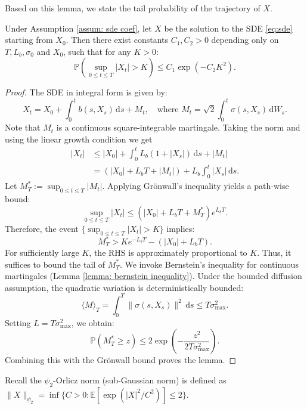 \documentclass[twoside,11pt]{article}
\newcommand{\1}{\mathbf{1}}
\numberwithin{equation}{section}
\begin{document}
Based on this lemma, we state the tail probability of the trajectory of $ X$.
\begin{lemma}\label{lemma: base tail}
    Under Assumption \ref{assum: sde coef}, let $X$ be the solution to the SDE \eqref{eq:sde} starting from $X_0$. Then there exist constants $C_1, C_2 > 0$ depending only on $T, L_b, \sigma_{0}$ and $X_0$, such that for any $K > 0$:
\begin{equation}
    \mathbb{P}\left( \sup_{0 \le t \le T} |X_t| > K \right) \le C_1 \exp(-C_2 K^2).
\end{equation}
\end{lemma}
\begin{proof}
The SDE in integral form is given by:
\begin{equation}
    X_t = X_0 + \int_0^t b(s, X_s) \, \mathrm{d}s + M_t, \quad \text{where } M_t = \sqrt{2}\int_0^t \sigma(s, X_s) \, \mathrm{d}W_s.
\end{equation}
Note that $M_t$ is a continuous square-integrable martingale. Taking the norm and using the linear growth condition we get
\begin{align}
    |X_t| &\le |X_0| + \int_0^t L_b(1 + |X_s|) \, \mathrm{d}s + |M_t| \nonumber \\
          &= \left( |X_0| + L_b T + |M_t| \right) + L_b \int_0^t |X_s| \, \mathrm{d}s.
\end{align}
Let $M^*_T := \sup_{0 \le t \le T} |M_t|$. Applying Grönwall's inequality yields a path-wise bound:
\begin{equation}
    \sup_{0 \le t \le T} |X_t| \le \left( |X_0| + L_b T + M^*_T \right) e^{L_b T}.
\end{equation}
Therefore, the event $\{\sup_{0 \le t \le T} |X_t| > K\}$ implies:
\begin{equation}
    M^*_T > K e^{-L_b T} - (|X_0| + L_b T).
\end{equation}
For sufficiently large $K$, the RHS is approximately proportional to $K$. Thus, it suffices to bound the tail of $M^*_T$.
We invoke Bernstein's inequality for continuous martingales (Lemma \ref{lemma: bernstein inequality}).
Under the bounded diffusion assumption, the quadratic variation is deterministically bounded:
\begin{equation}
    \langle M \rangle_T = \int_0^T \|\sigma(s, X_s)\|^2 \, \mathrm{d}s \le T \sigma_{\max}^2.
\end{equation}
Setting $L = T \sigma_{\max}^2$, we obtain:
\begin{equation}
    \mathbb{P}(M^*_T \ge z) \le 2 \exp\left( -\frac{z^2}{2 T \sigma_{\max}^2} \right).
\end{equation}
Combining this with the Grönwall bound proves the lemma.
\end{proof}
 Recall the $\psi_2$-Orlicz norm (sub-Gaussian norm) is defined as $\|X\|_{\psi_2} = \inf \{ C > 0 : \mathbb{E}[\exp(|X|^2/C^2)] \le 2 \}$.
\end{document}

